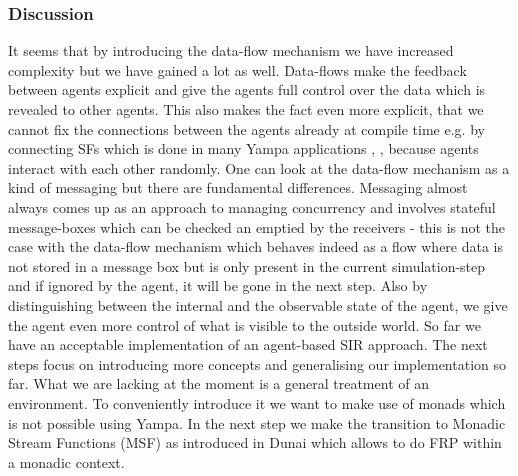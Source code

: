 \subsubsection{Discussion}
It seems that by introducing the data-flow mechanism we have increased complexity but we have gained a lot as well. Data-flows make the feedback between agents explicit and give the agents full control over the data which is revealed to other agents. This also makes the fact even more explicit, that we cannot fix the connections between the agents already at compile time e.g. by connecting SFs which is done in many Yampa applications \cite{nilsson_functional_2002}, \cite{courtney_yampa_2003}, \cite{nilsson_declarative_2014} because agents interact with each other randomly. One can look at the data-flow mechanism as a kind of messaging but there are fundamental differences. Messaging almost always comes up as an approach to managing concurrency and involves stateful message-boxes which can be checked an emptied by the receivers - this is not the case with the data-flow mechanism which behaves indeed as a flow where data is not stored in a message box but is only present in the current simulation-step and if ignored by the agent, it will be gone in the next step.
Also by distinguishing between the internal and the observable state of the agent, we give the agent even more control of what is visible to the outside world.
So far we have an acceptable implementation of an agent-based SIR approach. The next steps focus on introducing more concepts and generalising our implementation so far. What we are lacking at the moment is a general treatment of an environment. To conveniently introduce it we want to make use of monads which is not possible using Yampa. In the next step we make the transition to Monadic Stream Functions (MSF) as introduced in Dunai \cite{perez_functional_2016} which allows to do FRP within a monadic context.